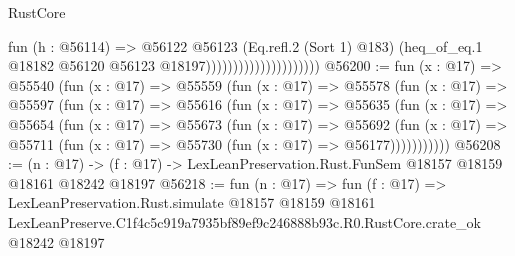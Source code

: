 \begin{lexlean}{RustCore}
\begin{coremodule}
                                          fun (h : @56114) =>
                                          @56122
                                            @56123
                                            (Eq.refl.{2} (Sort 1) @183)
                                            (heq_of_eq.{1}
                                              @18182
                                              @56120
                                              @56123
                                              @18197)))))))))))))))))))))
@56200 := fun (x : @17) =>
  @55540
    (fun (x : @17) =>
    @55559
      (fun (x : @17) =>
      @55578
        (fun (x : @17) =>
        @55597
          (fun (x : @17) =>
          @55616
            (fun (x : @17) =>
            @55635
              (fun (x : @17) =>
              @55654
                (fun (x : @17) =>
                @55673
                  (fun (x : @17) =>
                  @55692
                    (fun (x : @17) =>
                    @55711 (fun (x : @17) => @55730 (fun (x : @17) => @56177)))))))))))
@56208 := (n : @17) ->
  (f : @17) -> LexLeanPreservation.Rust.FunSem @18157 @18159 @18161 @18242 @18197
@56218 := fun (n : @17) =>
  fun (f : @17) =>
  LexLeanPreservation.Rust.simulate
    @18157
    @18159
    @18161
    LexLeanPreserve.C1f4c5c919a7935bf89ef9c246888b93c.R0.RustCore.crate_ok
    @18242
    @18197
\end{coremodule}
\end{lexlean}
